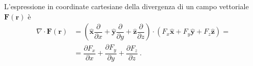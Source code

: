 \begin{property}
L'espressione in coordinate cartesiane della divergenza di un campo vettoriale $\mathbf{F}(\mathbf{r})$ è
    \begin{equation}
        \begin{aligned}
            \nabla \cdot \mathbf{F}(\mathbf{r}) & = \left( \mathbf{\hat{x}} \dfrac{\partial}{\partial x} + \mathbf{\hat{y}} \dfrac{\partial}{\partial y} + \mathbf{\hat{z}} \dfrac{\partial}{\partial z} \right) \cdot (F_x \mathbf{\hat{x}} + F_y \mathbf{\hat{y}} + F_z \mathbf{\hat{z}} ) = \\
        & = \dfrac{\partial F_x}{\partial x} + \dfrac{\partial F_y}{\partial y} + \dfrac{\partial F_z}{\partial z} \ .
        \end{aligned}
    \end{equation}
\end{property}

\begin{property}
\end{property}

